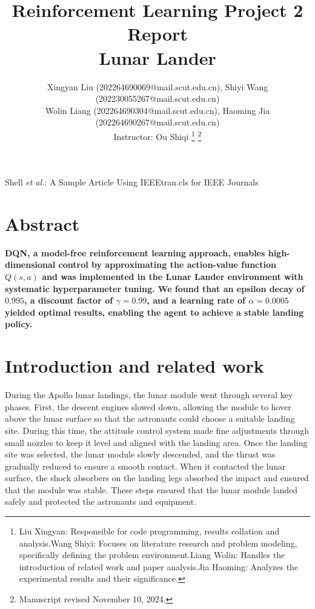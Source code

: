 \documentclass[conference]{IEEEtran}
\begin{document}
\title{Reinforcement Learning Project 2 Report\\ Lunar Lander}

\author{Xingyan Liu (202264690069@mail.scut.edu.cn), Shiyi Wang (202230055267@mail.scut.edu.cn) \\Wolin Liang (202264690304@mail.scut.edu.cn), Haoming Jia (202264690267@mail.scut.edu.cn) 
\\Instructor: Ou Shiqi
\thanks{Liu Xingyan: Responsible for code programming, results collation and analysis.Wang Shiyi: Focuses on literature research and problem modeling, specifically defining the problem environment.Liang Wolin: Handles the introduction of related work and paper analysis.Jia Haoming: Analyzes the experimental results and their significance.}%
\thanks{Manuscript revised November 10, 2024.}}

%
{Shell \MakeLowercase{\textit{et al.}}: A Sample Article Using IEEEtran.cls for IEEE Journals}

\maketitle
\section*{Abstract}
\textbf{DQN, a model-free reinforcement learning approach, enables high-dimensional control by approximating the action-value function \( Q(s, a) \) and was implemented in the Lunar Lander environment with systematic hyperparameter tuning. We found that an epsilon decay of \( 0.995 \), a discount factor of \( \gamma = 0.99 \), and a learning rate of \( \alpha = 0.0005 \) yielded optimal results, enabling the agent to achieve a stable landing policy.}


\section{Introduction and related work}

During the Apollo lunar landings, the lunar module went through several key phases. First, the descent engines slowed down, allowing the module to hover above the lunar surface so that the astronauts could choose a suitable landing site. During this time, the attitude control system made fine adjustments through small nozzles to keep it level and aligned with the landing area. Once the landing site was selected, the lunar module slowly descended, and the thrust was gradually reduced to ensure a smooth contact. When it contacted the lunar surface, the shock absorbers on the landing legs absorbed the impact and ensured that the module was stable. These steps ensured that the lunar module landed safely and protected the astronauts and equipment.
\end{document}
